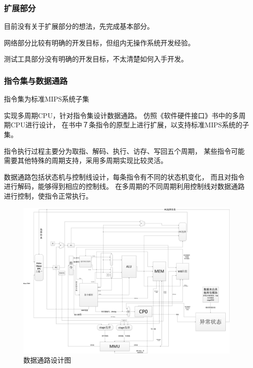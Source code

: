         \subsubsection{扩展部分}
            目前没有关于扩展部分的想法，先完成基本部分。

            网络部分比较有明确的开发目标，但组内无操作系统开发经验。

            测试工具部分没有明确的开发目标，不太清楚如何入手开发。

        \subsubsection{指令集与数据通路}
            指令集为标准MIPS系统子集

            实现多周期CPU，针对指令集设计数据通路。
            仿照《软件硬件接口》书中的多周期CPU进行设计，
            在书中７条指令的原型上进行扩展，以支持标准MIPS系统的子集。
            
            指令执行过程主要分为取指、解码、执行、访存、写回五个周期，
            某些指令可能需要其他特殊的周期支持，采用多周期实现比较灵活。

            数据通路包括状态机与控制线设计，每条指令有不同的状态机变化，
            而且对指令进行解码，能够得到相应的控制线。%
            在多周期的不同周期利用控制线对数据通路进行控制，使指令正常执行。
            
            \begin{figure}[!hbp]
                    \centering
                    \caption{数据通路设计图}
                    \includegraphics[width=\textwidth]{picture/CPU_Design.jpg}
            \end{figure}

